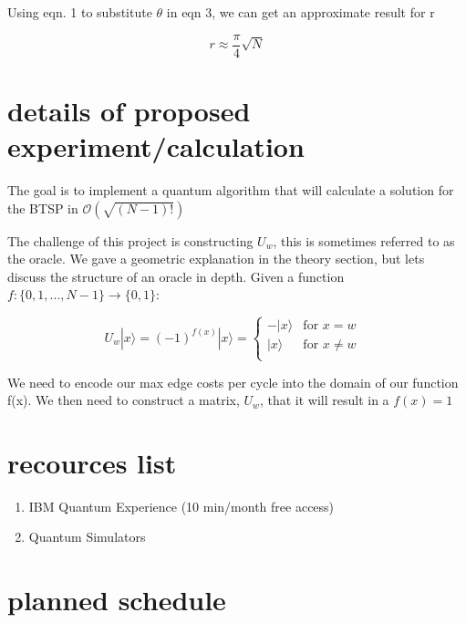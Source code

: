 \documentclass[twocolumn,showpacs,preprintnumbers,amsmath,amssymb]{revtex4}
\begin{document}
		Using eqn. 1 to substitute $\theta$ in eqn 3, we can get an approximate result for r
		
		\begin{equation}
			r \approx \frac{\pi}{4}\sqrt{N}
		\end{equation}
		
		
		
		
		\section{details of proposed experiment/calculation}
		
		The goal is to implement a quantum algorithm that will calculate a solution for the BTSP in $\mathcal{O}(\sqrt{(N-1)!})$
		
		The challenge of this project is constructing $U_w$, this is sometimes referred to as the oracle. We gave a geometric explanation in the theory section, but lets discuss the structure of an oracle in depth. Given a function $f: \{0,1,...,N-1\} \rightarrow \{0,1\}$:
		
		\begin{equation}
			U_{w}|x\rangle = (-1)^{f(x)}|x\rangle = 
			\begin{cases}
				-|x\rangle & \text{for  $x=w$ }\\
				|x\rangle  & \text{for $x\neq w$}\\
			\end{cases}       
		\end{equation}
		
		We need to encode our max edge costs per cycle into the domain of our function f(x). We then need to construct a matrix, $U_w$, that it will result in a $f(x) = 1$
		
		\section{recources list}
		\begin{enumerate}
			\item IBM Quantum Experience (10 min/month free access)
			\item Quantum Simulators
		\end{enumerate}
		
		\section{planned schedule}
		
\end{document}
